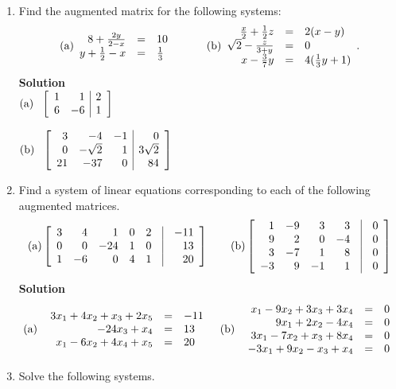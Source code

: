 \begin{enumerate}
\item Find the augmented matrix for the following systems:
$$\rm{(a)} \begin{array}{rrl} 8+\frac{2y}{2-x}&=&10\\
y+\frac{1}{2}-x&=&\frac{1}{3} \end{array} \quad \quad \quad
\rm{(b)} \begin{array}{rrl} \frac{x}{2}+\frac{1}{2}z&=&2(x-y)\\
\sqrt{2}-\frac{z}{3+y}&=&0\\ x-\frac{3}{7}y&=&4(\frac{1}{3}y+1)
\end{array}.$$
\noindent \textbf{Solution}
\\
$\rm{(a)} \ \    \left [
\begin{array}{rr|r}
                     1&1&2\\
                     6&-6&1\end{array} \right ]$

${\rm (b)} \ \  \left [ \begin{array}{rrr|r}
                     3&-4&-1&0\\
                     0&-\sqrt{2}&1&3\sqrt{2}\\
                     21&-37&0&84\end{array}\right]$
\item Find a system of linear equations corresponding to each of
the following augmented matrices. $$\rm{(a)} \left [
\begin{array}{rrrrrcr}
                3&4&1&0&2&\vline&-11\\
                0&0&-24&1&0&\vline&13\\
                1&-6&0&4&1&\vline&20\\ \end{array} \right ]\quad \quad
\rm{(b)} \left [ \begin{array}{rrrrcr}
                1&-9&3&3&\vline&0\\
                9&2&0&-4&\vline&0\\
                3&-7&1&8&\vline&0\\
                -3&9&-1&1&\vline&0 \end{array} \right ]$$
\noindent \textbf{Solution}
$$\rm{ (a)}\ \  \begin{array}{rrl}
                        3x_{1}+4x_{2}+x_{3}+2x_{5}&=&-11\\
                        -24x_{3}+x_{4}&=&13\\
                        x_{1}-6x_{2}+4x_{4}+x_{5}&=&20\end{array}\quad
\rm{ (b)} \ \ \begin{array}{rrl}
                        x_{1}-9x_{2}+3x_{3}+3x_{4}&=&0\\
                        9x_{1}+2x_{2}-4x_{4}&=&0\\
                        3x_{1}-7x_{2}+x_{3}+8x_{4}&=&0\\
                        -3x_1+9x_2-x_3+x_4&=&0 \end{array}$$
\item Solve the following systems.


\end{enumerate}
